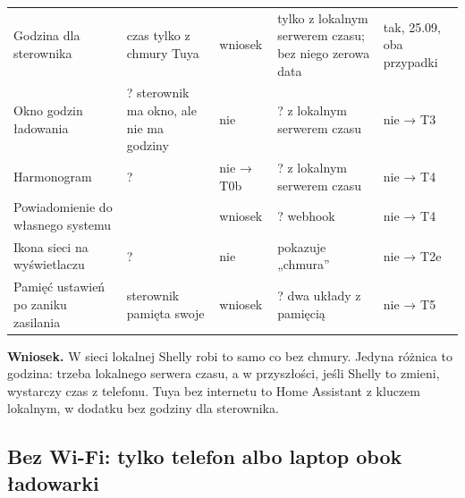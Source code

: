 \documentclass[11pt,a4paper]{article}
\begin{document}
\begin{longtable}{>{\raggedright\arraybackslash}p{3.54cm}>{\raggedright\arraybackslash}p{2.52cm}>{\raggedright\arraybackslash}p{2.35cm}>{\raggedright\arraybackslash}p{2.94cm}>{\raggedright\arraybackslash}p{3.05cm}}
Godzina dla sterownika & \leavevmode{\symbolfont\color{apred}\textbf{✘}} czas tylko z chmury Tuya & wniosek & \leavevmode{\symbolfont\color{apamber}\textbf{◐}} tylko z lokalnym serwerem czasu; bez niego zerowa data & tak, 25.09, oba przypadki \\
Okno godzin ładowania & ? sterownik ma okno, ale nie ma godziny & nie & ? z lokalnym serwerem czasu & nie {\symbolfont→} T3 \\
Harmonogram & ? & nie {\symbolfont→} T0b & ? z lokalnym serwerem czasu & nie {\symbolfont→} T4 \\
Powiadomienie do własnego systemu & \leavevmode{\symbolfont\color{apred}\textbf{✘}} & wniosek & ? webhook & nie {\symbolfont→} T4 \\
Ikona sieci na wyświetlaczu & ? & nie & \leavevmode{\symbolfont\color{apamber}\textbf{◐}} pokazuje „chmura” & nie {\symbolfont→} T2e \\
Pamięć ustawień po zaniku zasilania & \leavevmode{\symbolfont\color{apamber}\textbf{◐}} sterownik pamięta swoje & wniosek & ? dwa układy z pamięcią & nie {\symbolfont→} T5 \\
\end{longtable}

\textbf{Wniosek.} W sieci lokalnej Shelly robi to samo co bez chmury. Jedyna różnica to godzina: trzeba lokalnego serwera czasu, a w przyszłości, jeśli Shelly to zmieni, wystarczy czas z telefonu. Tuya bez internetu to Home Assistant z kluczem lokalnym, w dodatku bez godziny dla sterownika.


\subsection{Bez Wi-Fi: tylko telefon albo laptop obok ładowarki}
\end{document}
